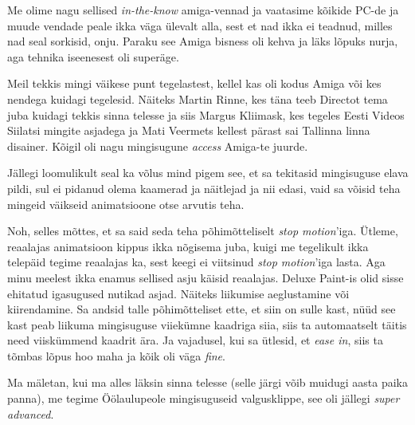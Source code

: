 Me olime nagu sellised \emph{in-the-know} amiga-vennad ja vaatasime  kõikide PC-de  ja muude vendade peale ikka väga ülevalt alla, sest et nad ikka ei teadnud, milles nad seal sorkisid, onju. Paraku see Amiga bisness oli kehva ja läks lõpuks nurja, aga tehnika iseenesest oli superäge. 

Meil tekkis mingi väikese punt tegelastest, kellel kas oli kodus Amiga või kes nendega kuidagi tegelesid. Näiteks Martin Rinne, kes täna teeb Directot tema juba kuidagi tekkis  sinna telesse ja siis Margus Kliimask, kes tegeles Eesti Videos Siilatsi mingite asjadega ja Mati Veermets kellest pärast sai Tallinna linna disainer.  Kõigil oli nagu mingisugune \emph{access} Amiga-te juurde. 

Jällegi loomulikult seal ka võlus mind pigem see, et sa tekitasid mingisuguse elava pildi, sul ei  pidanud olema kaamerad ja näitlejad ja nii edasi, vaid sa võisid teha mingeid väikseid animatsioone otse arvutis teha.


Noh, selles mõttes, et sa said seda teha põhimõtteliselt \emph{stop motion}'iga. Ütleme,  reaalajas animatsioon kippus ikka nõgisema juba, kuigi me tegelikult ikka telepäid tegime reaalajas ka, sest keegi ei viitsinud \emph{stop motion}'iga lasta. Aga minu meelest ikka enamus sellised asju käisid reaalajas. Deluxe Paint-is olid sisse ehitatud igasugused nutikad asjad. Näiteks  liikumise aeglustamine või kiirendamine. Sa andsid talle põhimõtteliset ette, et siin on sulle kast, nüüd see kast peab liikuma mingisuguse viiekümne kaadriga siia, siis ta automaatselt täitis need viiskümmend kaadrit ära. Ja vajadusel, kui sa ütlesid, et \emph{ease in}, siis ta tõmbas lõpus hoo maha ja kõik oli väga \emph{fine}.  

Ma mäletan, kui ma alles läksin sinna telesse (selle järgi võib muidugi aasta paika panna), me tegime Öölaulupeole  mingisuguseid valgusklippe, see oli jällegi \emph{super advanced}.


